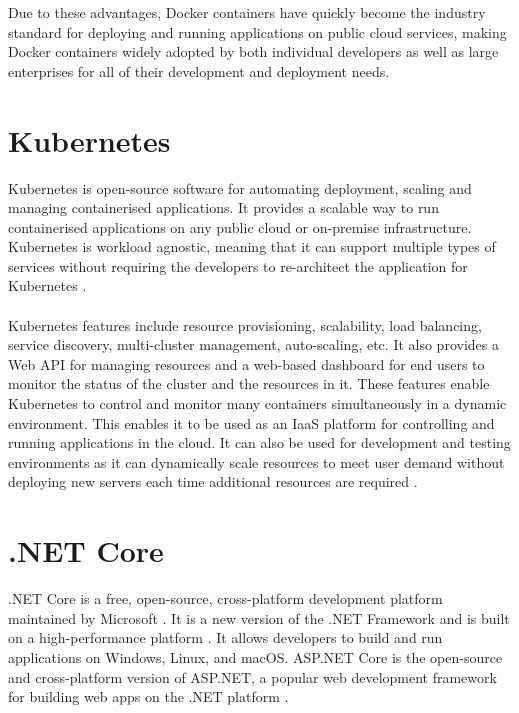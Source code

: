 \documentclass[BIF,Bachelor,nenglish]{twbook}%
\begin{document}
\noindent
Due to these advantages, Docker containers have quickly become the industry standard for deploying and running applications on public cloud services, making Docker containers widely adopted by both individual developers as well as large enterprises for all of their development and deployment needs.

\section{Kubernetes}
Kubernetes is open-source software for automating deployment, scaling and managing containerised applications. It provides a scalable way to run containerised applications on any public cloud or on-premise infrastructure. Kubernetes is workload agnostic, meaning that it can support multiple types of services without requiring the developers to re-architect the application for Kubernetes \cite{luk2018}.
\\
\\
Kubernetes features include resource provisioning, scalability, load balancing, service discovery, multi-cluster management, auto-scaling, etc. It also provides a Web \ac{API} for managing resources and a web-based dashboard for end users to monitor the status of the cluster and the resources in it. These features enable Kubernetes to control and monitor many containers simultaneously in a dynamic environment. This enables it to be used as an \ac{IaaS} platform for controlling and running applications in the cloud. It can also be used for development and testing environments as it can dynamically scale resources to meet user demand without deploying new servers each time additional resources are required \cite{kubernetes}.

\section{.NET Core}
.NET Core is a free, open-source, cross-platform development platform maintained by Microsoft \cite{dotnetintro}. It is a new version of the .NET Framework and is built on a high-performance platform \cite{dotnetintro}. It allows developers to build and run applications on Windows, Linux, and macOS. ASP.NET Core is the open-source and cross-platform version of ASP.NET, a popular web development framework for building web apps on the .NET platform \cite{dotnetaspcore}.
\end{document}
